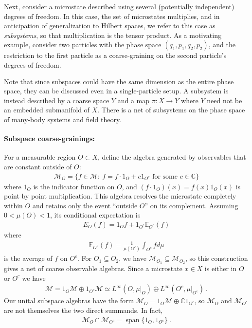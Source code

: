 \documentclass[a4paper,11pt]{article}
\theoremstyle{definition}
\begin{document}
Next, consider a microstate described using several (potentially independent) degrees of freedom. In this case, the set of microstates multiplies, and in anticipation of generalization to Hilbert spaces, we refer to this case as {\it subsystems}, so that multiplication is the tensor product. As a motivating example, consider two particles with the phase space $(q_1,p_1,q_2,p_2)$, and the restriction to the first particle as a coarse-graining on the second particle's degrees of freedom.

Note that since subspaces could have the same dimension as the entire phase space, they can be discussed even in a single-particle setup. A subsystem is instead described by a coarse space $Y$ and a map $\pi: X\to Y$ where $Y$ need not be an embedded submanifold of $X$. There is a net of subsystems on the phase space of many-body systems and field theory.



\paragraph{Subspace coarse-grainings:}
For a measurable region $O\subset X$, define the algebra generated by observables that are constant outside of $O$:
\begin{align}
    \mathcal M_O=\{f\in\mathcal M:\ f=f \cdot 1_O +c 1_{O^c}\text{ for some }c\in\mathbb C\}
\end{align}
where $1_O$ is the indicator function on $O$, and $(f\cdot 1_O)(x)=f(x)1_O(x)$ is point by point multiplication.
This algebra resolves the microstate completely within $O$ and retains only the event ``outside $O$'' on its complement. Assuming $0<\mu(O)<1$, its conditional expectation is
\begin{align}
    E_O(f)=1_O f+
    1_{O^c}\mathbb{E}_{O^c}(f)
\end{align}
where
\begin{align}
    \mathbb{E}_{O^c}(f)=\frac{1}{\mu(O^c)}\int_{O^c} f d\mu
\end{align}
is the average of $f$ on $O^c$.
For $O_1\subseteq O_2$, we have $\mathcal M_{O_1}\subseteq\mathcal M_{O_2}$, so this construction gives a net of coarse observable algebras. Since a microstate $x\in X$ is either in $O$ or $O^c$ we have
\begin{align}
    \mathcal M=1_O\mathcal M\oplus 1_{O^c}\mathcal M
    \simeq L^\infty(O,\mu|_O)\oplus L^\infty(O^c,\mu|_{O^c})\ .
\end{align}
Our unital subspace algebras have the form $\mathcal M_O=1_O\mathcal M\oplus\mathbb C1_{O^c}$, so $\mathcal M_O$ and $\mathcal M_{O^c}$ are not themselves the two direct summands. In fact,
\begin{align}
    \mathcal M_O\cap\mathcal M_{O^c}=\operatorname{span}\{1_O,1_{O^c}\}\ .
\end{align}
\end{document}
